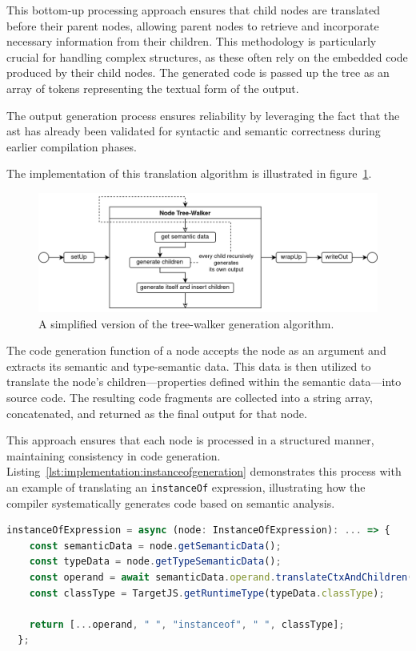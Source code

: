 This bottom-up processing approach ensures that child nodes are translated before their parent nodes, allowing parent nodes to retrieve and incorporate necessary information from their children. This methodology is particularly crucial for handling complex structures, as these often rely on the embedded code produced by their child nodes. The generated code is passed up the tree as an array of tokens representing the textual form of the output.

The output generation process ensures reliability by leveraging the fact that the \acrshort{ast} has already been validated for syntactic and semantic correctness during earlier compilation phases.

The implementation of this translation algorithm is illustrated in figure~\ref{fig:implementation:translationalgorithm}.

\begin{figure}[h!]
	\centering
	\includegraphics[scale=0.9]{./pics/Output-Generation.drawio}
	\caption{A simplified version of the tree-walker generation algorithm.}
	\label{fig:implementation:translationalgorithm}
\end{figure}

The code generation function of a node accepts the node as an argument and extracts its semantic and type-semantic data. This data is then utilized to translate the node's children—properties defined within the semantic data—into source code. The resulting code fragments are collected into a string array, concatenated, and returned as the final output for that node.

This approach ensures that each node is processed in a structured manner, maintaining consistency in code generation. Listing~\ref{lst:implementation:instanceofgeneration} demonstrates this process with an example of translating an \lstinline|instanceOf| expression, illustrating how the compiler systematically generates code based on semantic analysis.

\begin{lstlisting}[language=TypeScript,caption=The code generation function of a \lstinline|instanceOf| expression,label=lst:implementation:instanceofgeneration]
instanceOfExpression = async (node: InstanceOfExpression): ... => {
	const semanticData = node.getSemanticData();
	const typeData = node.getTypeSemanticData();
	const operand = await semanticData.operand.translateCtxAndChildren();
	const classType = TargetJS.getRuntimeType(typeData.classType);

    return [...operand, " ", "instanceof", " ", classType];
  };
\end{lstlisting}


